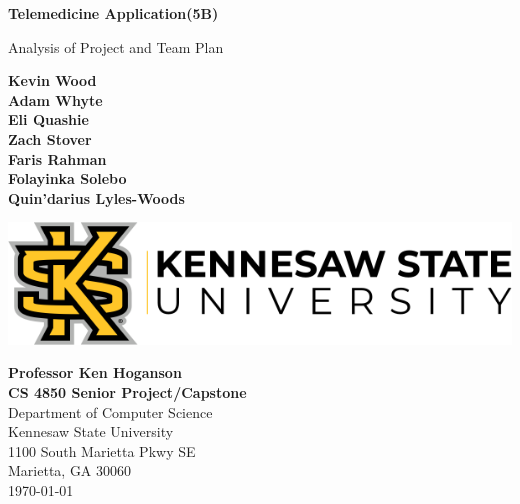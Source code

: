 \begin{titlepage}
\begin{center}
	\vspace*{1cm}

	\Huge
	\textbf{Telemedicine Application(5B)}

	\vspace{0.5cm}
	\LARGE
	Analysis of Project and Team Plan

	\vspace{1.5cm}
    \Large

	\textbf{Kevin Wood}\\
	\textbf{Adam Whyte}\\
	\textbf{Eli Quashie}\\
	\textbf{Zach Stover}\\
	\textbf{Faris Rahman}\\
	\textbf{Folayinka Solebo}\\
	\textbf{Quin'darius Lyles-Woods}\\
    

	\vfill
	\LARGE
	\vspace{0.8cm}

	\includegraphics[width=\textwidth]{kennesawlogo}

	\vspace{0.8cm}

	\Large
	\textbf{Professor Ken Hoganson} 			\\
    \textbf{CS 4850 Senior Project/Capstone} \\
	Department of Computer Science   \\
	Kennesaw State University       \\
	1100 South Marietta Pkwy SE     \\
	Marietta, GA 30060              \\
	\today	

	\vspace{1cm}

\end{center}
\end{titlepage}
